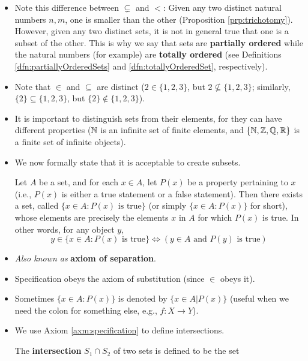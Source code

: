 \documentclass[../main.tex]{subfiles}
\begin{document}
\begin{itemize}
    \item Note this difference between $\subsetneq$ and $<$: Given any two distinct natural numbers $n,m$, one is smaller than the other (Proposition \ref{prp:trichotomy}). However, given any two distinct sets, it is not in general true that one is a subset of the other. This is why we say that sets are \textbf{partially ordered} while the natural numbers (for example) are \textbf{totally ordered} (see Definitions \ref{dfn:partiallyOrderedSets} and \ref{dfn:totallyOrderedSet}, respectively).
    \item Note that $\in$ and $\subseteq$ are distinct ($2\in\{1,2,3\}$, but $2\nsubseteq\{1,2,3\}$; similarly, $\{2\}\subseteq\{1,2,3\}$, but $\{2\}\notin\{1,2,3\}$).
    \item It is important to distinguish sets from their elements, for they can have different properties ($\mathbb{N}$ is an infinite set of finite elements, and $\{\mathbb{N},\mathbb{Z},\mathbb{Q},\mathbb{R}\}$ is a finite set of infinite objects).
    \item We now formally state that it is acceptable to create subsets.
    \begin{axm}\label{axm:specification}
        Let $A$ be a set, and for each $x\in A$, let $P(x)$ be a property pertaining to $x$ \textup{(}i.e., $P(x)$ is either a true statement or a false statement\textup{)}. Then there exists a set, called $\{x\in A:P(x)\text{ is true}\}$ \textup{(}or simply $\{x\in A:P(x)\}$ for short\textup{)}, whose elements are precisely the elements $x$ in $A$ for which $P(x)$ is true. In other words, for any object $y$,
        \begin{equation*}
            y\in\{x\in A:P(x)\text{ is true}\} \Longleftrightarrow (y\in A\text{ and }P(y)\text{ is true})
        \end{equation*}
    \end{axm}
    \item \emph{Also known as} \textbf{axiom of separation}.
    \item Specification obeys the axiom of substitution (since $\in$ obeys it).
    \item Sometimes $\{x\in A:P(x)\}$ is denoted by $\{x\in A\Big|P(x)\}$ (useful when we need the colon for something else, e.g., $f:X\to Y$).
    \item We use Axiom \ref{axm:specification} to define intersections.
    \begin{dfn}[Intersections]\label{dfn:intersection}
        The \textbf{intersection} $S_1\cap S_2$ of two sets is defined to be the set

\end{dfn}
\end{itemize}
\end{document}
